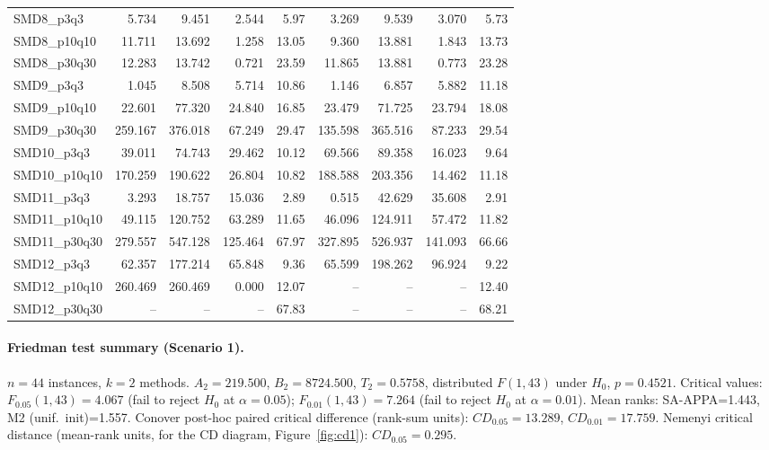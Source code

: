 \begin{longtable}{lrrrrrrrr}
SMD8\_p3q3 & 5.734 & 9.451 & 2.544 & 5.97 & 3.269 & 9.539 & 3.070 & 5.73 \\
SMD8\_p10q10 & 11.711 & 13.692 & 1.258 & 13.05 & 9.360 & 13.881 & 1.843 & 13.73 \\
SMD8\_p30q30 & 12.283 & 13.742 & 0.721 & 23.59 & 11.865 & 13.881 & 0.773 & 23.28 \\
SMD9\_p3q3 & 1.045 & 8.508 & 5.714 & 10.86 & 1.146 & 6.857 & 5.882 & 11.18 \\
SMD9\_p10q10 & 22.601 & 77.320 & 24.840 & 16.85 & 23.479 & 71.725 & 23.794 & 18.08 \\
SMD9\_p30q30 & 259.167 & 376.018 & 67.249 & 29.47 & 135.598 & 365.516 & 87.233 & 29.54 \\
SMD10\_p3q3 & 39.011 & 74.743 & 29.462 & 10.12 & 69.566 & 89.358 & 16.023 & 9.64 \\
SMD10\_p10q10 & 170.259 & 190.622 & 26.804 & 10.82 & 188.588 & 203.356 & 14.462 & 11.18 \\
SMD11\_p3q3 & 3.293 & 18.757 & 15.036 & 2.89 & 0.515 & 42.629 & 35.608 & 2.91 \\
SMD11\_p10q10 & 49.115 & 120.752 & 63.289 & 11.65 & 46.096 & 124.911 & 57.472 & 11.82 \\
SMD11\_p30q30 & 279.557 & 547.128 & 125.464 & 67.97 & 327.895 & 526.937 & 141.093 & 66.66 \\
SMD12\_p3q3 & 62.357 & 177.214 & 65.848 & 9.36 & 65.599 & 198.262 & 96.924 & 9.22 \\
SMD12\_p10q10 & 260.469 & 260.469 & 0.000 & 12.07 & -- & -- & -- & 12.40 \\
SMD12\_p30q30 & -- & -- & -- & 67.83 & -- & -- & -- & 68.21 \\
\end{longtable}
\endgroup

\paragraph{Friedman test summary (Scenario 1).}
$n=44$ instances, $k=2$ methods. $A_2=219.500$, $B_2=8724.500$, $T_2=0.5758$, distributed $F(1,43)$ under $H_0$, $p=0.4521$. Critical values: $F_{0.05}(1,43)=4.067$ (fail to reject $H_0$ at $\alpha=0.05$); $F_{0.01}(1,43)=7.264$ (fail to reject $H_0$ at $\alpha=0.01$). Mean ranks: SA-APPA=1.443, M2 (unif.\ init)=1.557. Conover post-hoc paired critical difference (rank-sum units): $CD_{0.05}=13.289$, $CD_{0.01}=17.759$. Nemenyi critical distance (mean-rank units, for the CD diagram, Figure~\ref{fig:cd1}): $CD_{0.05}=0.295$.


